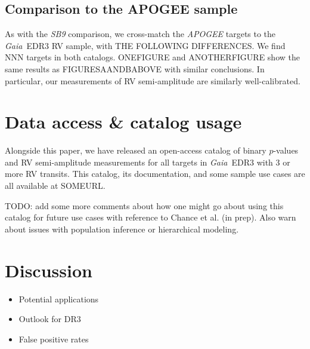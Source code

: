 \documentclass[modern, letterpaper]{aastex631}
\newcommand{\project}[1]{\textsl{#1}}
\newcommand{\Gaia}{\project{Gaia}}
\begin{document}
\subsection{Comparison to the APOGEE sample}

As with the \project{SB9} comparison, we cross-match the \project{APOGEE} targets to the \Gaia\ EDR3 RV sample, with THE FOLLOWING DIFFERENCES.
We find NNN targets in both catalogs.
ONEFIGURE and ANOTHERFIGURE show the same results as FIGURESAANDBABOVE with similar conclusions.
In particular, our measurements of RV semi-amplitude are similarly well-calibrated.

\section{Data access \& catalog usage}

Alongside this paper, we have released an open-access catalog of binary $p$-values and RV semi-amplitude measurements for all targets in \Gaia\ EDR3 with 3 or more RV transits.
This catalog, its documentation, and some sample use cases are all available at SOMEURL.

TODO: add some more comments about how one might go about using this catalog for future use cases with reference to Chance et al. (in prep).
Also warn about issues with population inference or hierarchical modeling.


\section{Discussion}

\begin{itemize}
	\item Potential applications
	\item Outlook for DR3
	\item False positive rates
\end{itemize}




\end{document}
